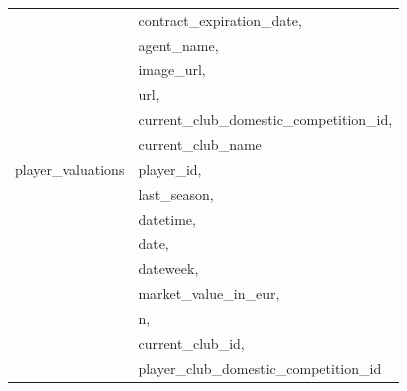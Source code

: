 \documentclass{Configuration_Files/PoliMi3i_thesis}
\begin{document}
\begin{tabular}{|l|p{13cm}|}
	                      & contract\_expiration\_date,               \\
	                      & agent\_name,                              \\
	                      & image\_url,                               \\
	                      & url,                                      \\
	                      & current\_club\_domestic\_competition\_id, \\
	                      & current\_club\_name                       \\
	\hline
	player\_valuations
	                      & player\_id,                               \\
	                      & last\_season,                             \\
	                      & datetime,                                 \\
	                      & date,                                     \\
	                      & dateweek,                                 \\
	                      & market\_value\_in\_eur,                   \\
	                      & n,                                        \\
	                      & current\_club\_id,                        \\
	                      & player\_club\_domestic\_competition\_id   \\
	\hline
	
\end{tabular}
\end{document}
